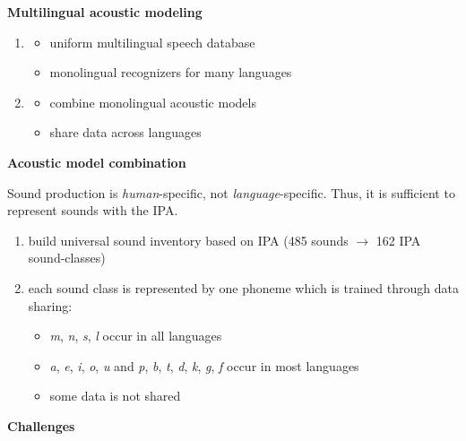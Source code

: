 \vspace{10pt}
\textbf{Multilingual acoustic modeling}
\vspace{10pt}

\begin{enumerate}
    \item \begin{itemize}
            \item uniform multilingual speech database
            \item monolingual recognizers for many languages
        \end{itemize}
    \item \begin{itemize}
            \item combine monolingual acoustic models
            \item share data across languages
        \end{itemize}
\end{enumerate}

\vspace{10pt}
\textbf{Acoustic model combination}
\vspace{10pt}

Sound production is \textit{human}-specific, not \textit{language}-specific. Thus, it is sufficient to represent sounds with the IPA.
\begin{enumerate}
    \item build universal sound inventory based on IPA (485 sounds $\rightarrow$ 162 IPA sound-classes)
    \item each sound class is represented by one phoneme which is trained through data sharing:
        \begin{itemize}
            \item \textit{m}, \textit{n}, \textit{s}, \textit{l} occur in all languages
            \item \textit{a}, \textit{e}, \textit{i}, \textit{o}, \textit{u} and \textit{p}, \textit{b}, \textit{t}, \textit{d}, \textit{k}, \textit{g}, \textit{f} occur in most languages
            \item some data is not shared
        \end{itemize}
\end{enumerate}

\vspace{10pt}
\textbf{Challenges}
\vspace{5pt}

